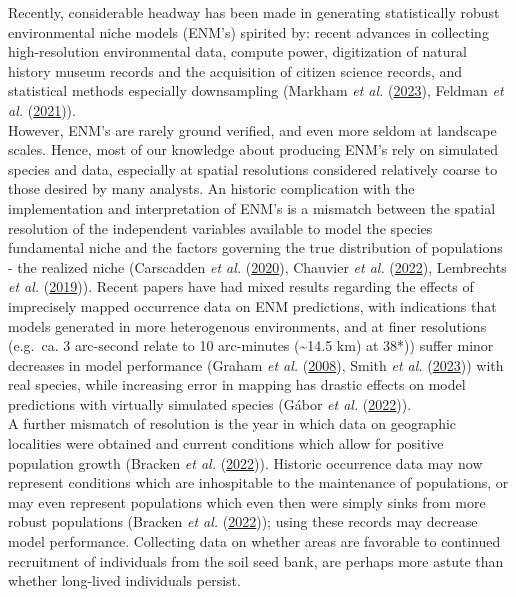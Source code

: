 \documentclass[
]{article}
\begin{document}
Recently, considerable headway has been made in generating statistically
robust environmental niche models (ENM's) spirited by: recent advances
in collecting high-resolution environmental data, compute power,
digitization of natural history museum records and the acquisition of
citizen science records, and statistical methods especially downsampling
(Markham \emph{et al.}
(\protect\hyperlink{ref-markham2023review}{2023}), Feldman \emph{et al.}
(\protect\hyperlink{ref-feldman2021trends}{2021})).\\
However, ENM's are rarely ground verified, and even more seldom at
landscape scales. Hence, most of our knowledge about producing ENM's
rely on simulated species and data, especially at spatial resolutions
considered relatively coarse to those desired by many analysts. An
historic complication with the implementation and interpretation of
ENM's is a mismatch between the spatial resolution of the independent
variables available to model the species fundamental niche and the
factors governing the true distribution of populations - the realized
niche (Carscadden \emph{et al.}
(\protect\hyperlink{ref-carscadden2020niche}{2020}), Chauvier \emph{et
al.} (\protect\hyperlink{ref-chauvier2022resolution}{2022}), Lembrechts
\emph{et al.}
(\protect\hyperlink{ref-lembrechts2019incorporating}{2019})). Recent
papers have had mixed results regarding the effects of imprecisely
mapped occurrence data on ENM predictions, with indications that models
generated in more heterogenous environments, and at finer resolutions
(e.g.~ca. 3 arc-second relate to 10 arc-minutes (\textasciitilde14.5 km)
at 38*)) suffer minor decreases in model performance (Graham \emph{et
al.} (\protect\hyperlink{ref-graham2008influence}{2008}), Smith \emph{et
al.} (\protect\hyperlink{ref-smith2023including}{2023})) with real
species, while increasing error in mapping has drastic effects on model
predictions with virtually simulated species (Gábor \emph{et al.}
(\protect\hyperlink{ref-gabor2022positional}{2022})).\\
A further mismatch of resolution is the year in which data on geographic
localities were obtained and current conditions which allow for positive
population growth (Bracken \emph{et al.}
(\protect\hyperlink{ref-bracken2022maximizing}{2022})). Historic
occurrence data may now represent conditions which are inhospitable to
the maintenance of populations, or may even represent populations which
even then were simply sinks from more robust populations (Bracken
\emph{et al.} (\protect\hyperlink{ref-bracken2022maximizing}{2022}));
using these records may decrease model performance. Collecting data on
whether areas are favorable to continued recruitment of individuals from
the soil seed bank, are perhaps more astute than whether long-lived
individuals persist.
\end{document}
